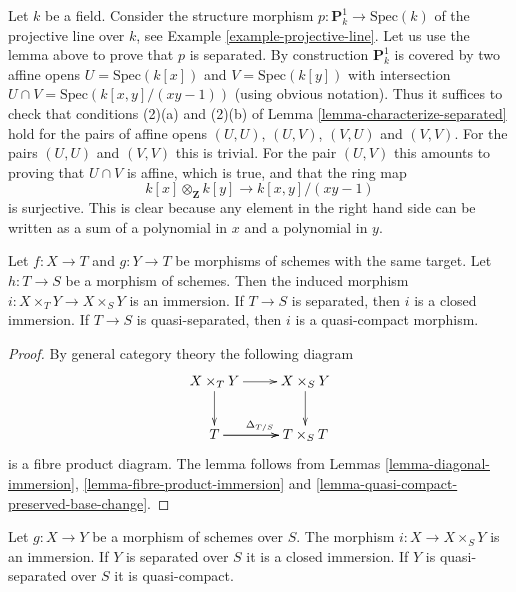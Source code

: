 \begin{example}
\label{example-projective-line-separated}
Let $k$ be a field. Consider the structure morphism
$p : \mathbf{P}^1_k \to \text{Spec}(k)$ of the projective
line over $k$, see Example \ref{example-projective-line}.
Let us use the lemma above to prove that $p$
is separated. By construction $\mathbf{P}^1_k$ is covered by two
affine opens $U = \text{Spec}(k[x])$ and $V = \text{Spec}(k[y])$
with intersection $U \cap V = \text{Spec}(k[x, y]/(xy - 1))$
(using obvious notation). Thus it suffices to check that
conditions (2)(a) and (2)(b) of Lemma \ref{lemma-characterize-separated}
hold for the pairs of affine opens $(U, U)$, $(U, V)$, $(V, U)$
and $(V, V)$. For the pairs $(U, U)$ and $(V, V)$ this is trivial.
For the pair $(U, V)$ this amounts to proving
that $U \cap V$ is affine, which is true, and that the ring map
$$
k[x] \otimes_{\mathbf{Z}} k[y] \longrightarrow k[x, y]/(xy - 1)
$$
is surjective. This is clear because any element in the
right hand side can be written as a sum of a polynomial
in $x$ and a polynomial in $y$.
\end{example}

\begin{lemma}
\label{lemma-fibre-product-after-map}
Let $f : X \to T$ and $g : Y \to T$ be morphisms of schemes
with the same target. Let $h : T \to S$ be a morphism of schemes.
Then the induced morphism $i : X \times_T Y \to X \times_S Y$ is
an immersion. If $T \to S$ is separated, then $i$ is a closed
immersion. If $T \to S$ is quasi-separated, then $i$ is a
quasi-compact morphism.
\end{lemma}

\begin{proof}
By general category theory the following diagram
$$
\xymatrix{
X \times_T Y \ar[r] \ar[d] & X \times_S Y \ar[d] \\
T \ar[r]^{\Delta_{T/S}} \ar[r] & T \times_S T
}
$$
is a fibre product diagram. The lemma follows
from Lemmas \ref{lemma-diagonal-immersion},
\ref{lemma-fibre-product-immersion} and
\ref{lemma-quasi-compact-preserved-base-change}.
\end{proof}

\begin{lemma}
\label{lemma-semi-diagonal}
Let $g : X \to Y$ be a morphism of schemes over $S$.
The morphism $i : X \to X \times_S Y$ is an immersion.
If $Y$ is separated over $S$ it is a closed immersion.
If $Y$ is quasi-separated over $S$ it is quasi-compact.
\end{lemma}

